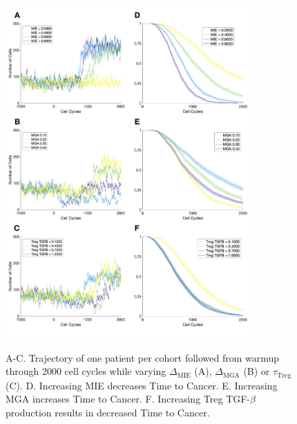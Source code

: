 \documentclass[11pt]{article}
\begin{document}
\begin{figure}
\center
{\includegraphics[width=0.85\textwidth]{Figure3/Figure3.pdf}}
\caption{
A-C. Trajectory of one patient per cohort followed from warmup through 2000 cell cycles while varying $\Delta_\text{MIE}$ (A), $\Delta_\text{MGA}$ (B) or $\tau_\text{Treg}$ (C). 
D. Increasing MIE decreases Time to Cancer. 
E. Increasing MGA increases Time to Cancer.
F. Increasing Treg TGF-$\beta$ production results in decreased Time to Cancer.
}
\label{fig:FirstSurvivalCurves}
\end{figure}
\end{document}
